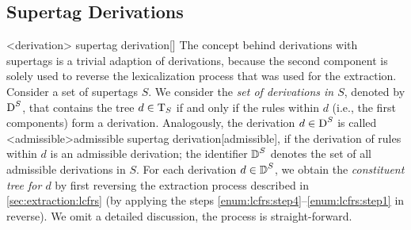 \documentclass[../../document.tex]{subfiles}
\begin{document}
    \subsection*{ Supertag Derivations}
    <derivation>{ supertag derivation}[]
    The concept behind derivations with  supertags is a trivial adaption of  derivations, because the second component is solely used to reverse the lexicalization process that was used for the extraction.
    Consider a set of  supertags \(S\).
    We consider the \emph{set of derivations in \(S\)}, denoted by \(\operatorname{D}^S\), that contains the tree \(d \in \operatorname{T}_S\) if and only if the  rules within \(d\) (i.e., the first components) form a derivation.
    Analogously, the derivation \(d\in \operatorname{D}^S\) is called <admissible>{admissible  supertag derivation}[admissible], if the derivation of  rules within \(d\) is an admissible derivation; the identifier \(\operatorname{\mathbb{D}}^S\) denotes the set of all admissible derivations in \(S\).
    For each derivation \(d \in \operatorname{\mathbb{D}}^S\), we obtain the \emph{constituent tree for \(d\)} by first reversing the extraction process described in \cref{sec:extraction:lcfrs} (by applying the steps \ref{enum:lcfrs:step4}--\ref{enum:lcfrs:step1} in reverse).
    We omit a detailed discussion, the process is straight-forward.
\end{document}
